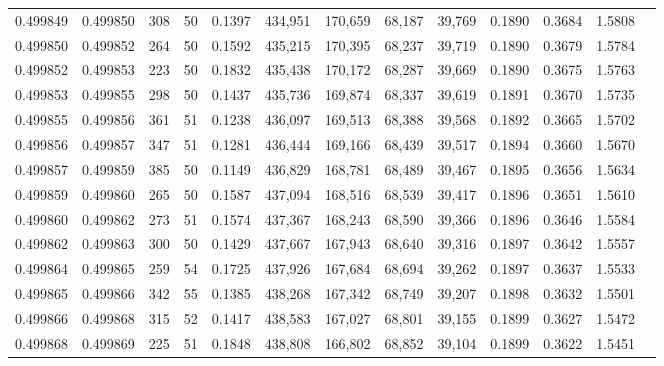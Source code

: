 \begin{tabular}{rrrrrrrrrrrrr}
0.499849 & 0.499850 & 308 &  50 &                                     0.1397 & 434,951 & 170,659 &  68,187 &  39,769 & 0.1890 & 0.3684 & 1.5808 \\
0.499850 & 0.499852 & 264 &  50 &                                     0.1592 & 435,215 & 170,395 &  68,237 &  39,719 & 0.1890 & 0.3679 & 1.5784 \\
0.499852 & 0.499853 & 223 &  50 &                                     0.1832 & 435,438 & 170,172 &  68,287 &  39,669 & 0.1890 & 0.3675 & 1.5763 \\
0.499853 & 0.499855 & 298 &  50 &                                     0.1437 & 435,736 & 169,874 &  68,337 &  39,619 & 0.1891 & 0.3670 & 1.5735 \\
0.499855 & 0.499856 & 361 &  51 &                                     0.1238 & 436,097 & 169,513 &  68,388 &  39,568 & 0.1892 & 0.3665 & 1.5702 \\
0.499856 & 0.499857 & 347 &  51 &                                     0.1281 & 436,444 & 169,166 &  68,439 &  39,517 & 0.1894 & 0.3660 & 1.5670 \\
0.499857 & 0.499859 & 385 &  50 &                                     0.1149 & 436,829 & 168,781 &  68,489 &  39,467 & 0.1895 & 0.3656 & 1.5634 \\
0.499859 & 0.499860 & 265 &  50 &                                     0.1587 & 437,094 & 168,516 &  68,539 &  39,417 & 0.1896 & 0.3651 & 1.5610 \\
0.499860 & 0.499862 & 273 &  51 &                                     0.1574 & 437,367 & 168,243 &  68,590 &  39,366 & 0.1896 & 0.3646 & 1.5584 \\
0.499862 & 0.499863 & 300 &  50 &                                     0.1429 & 437,667 & 167,943 &  68,640 &  39,316 & 0.1897 & 0.3642 & 1.5557 \\
0.499864 & 0.499865 & 259 &  54 &                                     0.1725 & 437,926 & 167,684 &  68,694 &  39,262 & 0.1897 & 0.3637 & 1.5533 \\
0.499865 & 0.499866 & 342 &  55 &                                     0.1385 & 438,268 & 167,342 &  68,749 &  39,207 & 0.1898 & 0.3632 & 1.5501 \\
0.499866 & 0.499868 & 315 &  52 &                                     0.1417 & 438,583 & 167,027 &  68,801 &  39,155 & 0.1899 & 0.3627 & 1.5472 \\
0.499868 & 0.499869 & 225 &  51 &                                     0.1848 & 438,808 & 166,802 &  68,852 &  39,104 & 0.1899 & 0.3622 & 1.5451 \\

\end{tabular}
